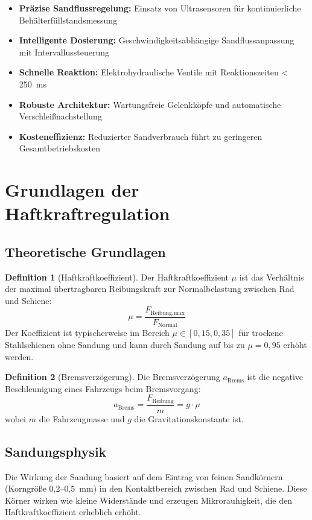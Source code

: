 \documentclass[a4paper,12pt]{article}
\theoremstyle{definition}
\newtheorem{definition}{Definition}
\theoremstyle{remark}
\begin{document}
\begin{itemize}
	\item \textbf{Präzise Sandflussregelung:} Einsatz von Ultrasensoren für kontinuierliche Behälterfüllstandsmessung
	\item \textbf{Intelligente Dosierung:} Geschwindigkeitsabhängige Sandflussanpassung mit Intervallussteuerung
	\item \textbf{Schnelle Reaktion:} Elektrohydraulische Ventile mit Reaktionszeiten < 250~ms
	\item \textbf{Robuste Architektur:} Wartungsfreie Gelenkköpfe und automatische Verschleißnachstellung
	\item \textbf{Kosteneffizienz:} Reduzierter Sandverbrauch führt zu geringeren Gesamtbetriebskosten
\end{itemize}

\section{Grundlagen der Haftkraftregulation}

\subsection{Theoretische Grundlagen}

\begin{definition}[Haftkraftkoeffizient]
	Der Haftkraftkoeffizient $\mu$ ist das Verhältnis der maximal übertragbaren Reibungskraft zur Normalbelastung zwischen Rad und Schiene:
	\[
	\mu = \frac{F_{\text{Reibung,max}}}{F_{\text{Normal}}}
	\]
	Der Koeffizient ist typischerweise im Bereich $\mu \in [0,15, 0,35]$ für trockene Stahlschienen ohne Sandung und kann durch Sandung auf bis zu $\mu = 0,95$ erhöht werden.
\end{definition}

\begin{definition}[Bremsverzögerung]
	Die Bremsverzögerung $a_{\text{Brems}}$ ist die negative Beschleunigung eines Fahrzeugs beim Bremsvorgang:
	\[
	a_{\text{Brems}} = \frac{F_{\text{Reibung}}}{m} = g \cdot \mu
	\]
	wobei $m$ die Fahrzeugmasse und $g$ die Gravitationskonstante ist.
\end{definition}

\subsection{Sandungsphysik}

Die Wirkung der Sandung basiert auf dem Eintrag von feinen Sandkörnern (Korngröße 0,2--0,5~mm) in den Kontaktbereich zwischen Rad und Schiene. Diese Körner wirken wie kleine Widerstände und erzeugen Mikrorauhigkeit, die den Haftkraftkoeffizient erheblich erhöht.
\end{document}

